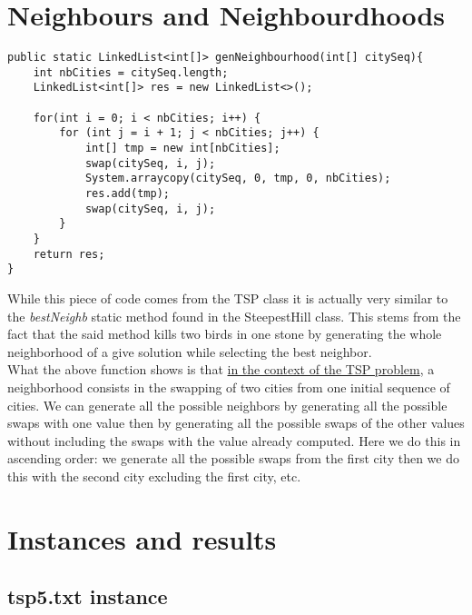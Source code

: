 \documentclass[./standalone.tex]{subfiles}
\begin{document}
	\section{Neighbours and Neighbourdhoods}
	\label{neighb}

	\begin{lstlisting}[style=Java, caption={Source code of the neighbourhood generation in the Tabu class}]
public static LinkedList<int[]> genNeighbourhood(int[] citySeq){
	int nbCities = citySeq.length;
	LinkedList<int[]> res = new LinkedList<>();
	
	for(int i = 0; i < nbCities; i++) {
		for (int j = i + 1; j < nbCities; j++) {
			int[] tmp = new int[nbCities];
			swap(citySeq, i, j);
			System.arraycopy(citySeq, 0, tmp, 0, nbCities);
			res.add(tmp);
			swap(citySeq, i, j);
		}
	}
	return res;
}		
	\end{lstlisting}
While this piece of code comes from the TSP class it is actually very similar to the \textit{bestNeighb} static method found in the SteepestHill class. This stems from the fact that the said method kills two birds in one stone by generating the whole neighborhood of a give solution while selecting the best neighbor.\\

What the above function shows is that \underline{in the context of the TSP problem}, a neighborhood consists in the swapping of two cities from one initial sequence of cities. We can generate all the possible neighbors by generating all the possible swaps with one value then by generating all the possible swaps of the other values without including the swaps with the value already computed. Here we do this in ascending order: we generate all the possible swaps from the first city then we do this with the second city excluding the first city, etc.\\
	
	
	\newpage
	\section{Instances and results}
	
	\subsection{tsp5.txt instance}
	
\end{document}
